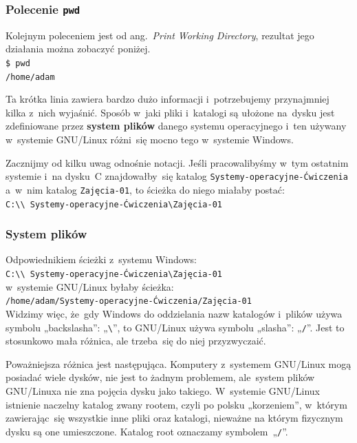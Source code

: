 \documentclass[10pt,t]{beamer}
\begin{document}
\begin{frame}
  \frametitle{Polecenie \texttt{pwd}}


  Kolejnym poleceniem jest
  od ang.~\textit{Print Working Directory}, rezultat jego działania można
  zobaczyć poniżej. \\
  \texttt{\$ pwd} \\
  \texttt{/home/adam}

  Ta krótka linia zawiera bardzo dużo informacji i~potrzebujemy przynajmniej
  kilka z~nich wyjaśnić. Sposób w~jaki pliki i~katalogi są ułożone na~dysku
  jest zdefiniowane przez \textbf{system plików} danego systemu
  operacyjnego i~ten używany w~systemie GNU/Linux różni~się mocno tego
  w~systemie Windows.

  Zacznijmy od kilku uwag odnośnie notacji. Jeśli pracowalibyśmy w~tym
  ostatnim systemie i~na dysku~C znajdowałby~się
  katalog \texttt{Systemy-operacyjne-Ćwiczenia} a~w~nim katalog
  \texttt{Zajęcia-01}, to ścieżka do niego miałaby postać: \\
  \texttt{C:\textbackslash\textbackslash
    Systemy-operacyjne-Ćwiczenia\textbackslash Zajęcia-01} \\

\end{frame}





\begin{frame}
  \frametitle{System plików}


  Odpowiednikiem ścieżki z~systemu Windows: \\
  \texttt{C:\textbackslash\textbackslash
    Systemy-operacyjne-Ćwiczenia\textbackslash Zajęcia-01} \\
  w~systemie GNU/Linux byłaby ścieżka: \\
  \texttt{/home/adam/Systemy-operacyjne-Ćwiczenia/Zajęcia-01} \\
  Widzimy więc, że~gdy Windows do oddzielania nazw katalogów i~plików
  używa symbolu „backslasha”: „\texttt{\textbackslash}”, to GNU/Linux
  używa symbolu „slasha”: „\texttt{/}”. Jest to stosunkowo mała różnica,
  ale trzeba~się do niej przyzwyczaić.

  Poważniejsza różnica jest następująca. Komputery z~systemem GNU/Linux
  mogą posiadać wiele dysków, nie jest to żadnym problemem, ale~system
  plików GNU/Linuxa nie zna pojęcia dysku jako takiego. W~systemie GNU/Linux
  istnienie naczelny katalog zwany rootem, czyli po polsku „korzeniem”,
  w~którym zawierając~się wszystkie inne pliki oraz katalogi, nieważne na
  którym fizycznym dysku są one umieszczone. Katalog root oznaczamy
  symbolem~„\texttt{/}”.

\end{frame}
\end{document}
